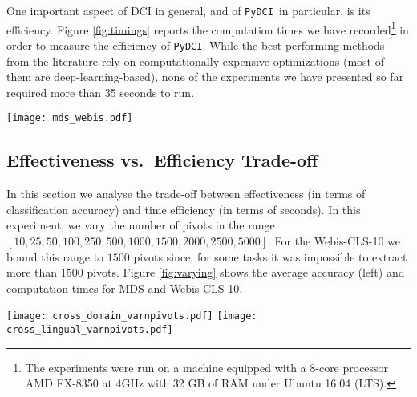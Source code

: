 \documentclass{article}
\newcommand{\pydci}{\texttt{PyDCI}}
\begin{document}
\noindent One important aspect of DCI in general, and of \pydci\ in
particular, is its efficiency. Figure \ref{fig:timings} reports the
computation times we have recorded\footnote{The experiments were run
on a machine equipped with a 8-core processor AMD FX-8350 at 4GHz with
32 GB of RAM under Ubuntu 16.04 (LTS).} in order to measure the
efficiency of \pydci.  While the best-performing methods from the
literature rely on computationally expensive optimizations (most of
them are deep-learning-based), none of the experiments we have
presented so far required more than 35 seconds to run.

\begin{figure*}[ht!]
  \centering \texttt{[image: mds\_webis.pdf]}
  \caption{Computation times for the MDS (left) and Webis-CLS-10
  (right) datasets. Values include the time required for pivot
  selection (Pivot), DCI projection (DCI), and SVM training and
  optimization (SVM). The time for preprocessing the documents is not included. Results for MDS are
  averages across 5 folds (see \citep{Blitzer:2007gf} for further
  details).}
  \label{fig:timings}
\end{figure*}



\subsection{Effectiveness vs.\ Efficiency Trade-off}
\label{sec:effvseff}

\noindent In this section we analyse the trade-off between
effectiveness (in terms of classification accuracy) and time
efficiency (in terms of seconds).  In this experiment, we vary the
number of pivots in the range
$[10,25,50,100,250,500,1000,1500,2000,2500,5000]$.  For the
Webis-CLS-10 we bound this range to $1500$ pivots since, for some
tasks it was impossible to extract more than $1500$ pivots.  Figure
\ref{fig:varying} shows the average accuracy (left) and computation
times for MDS and Webis-CLS-10.

\begin{figure*}[ht!]
  \centering
  \texttt{[image: cross\_domain\_varnpivots.pdf]}
  \texttt{[image: cross\_lingual\_varnpivots.pdf]}
  \caption{Effectiveness (left) and efficiency (right) of \pydci\ as a
  function of the number of pivots, for cross-domain (top) and
  cross-lingual (bottom) sentiment classification. }
  \label{fig:varying}
\end{figure*}
\end{document}
